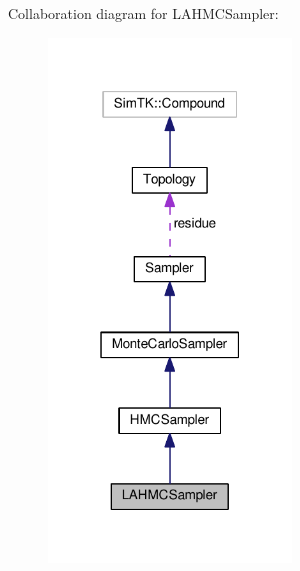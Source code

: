 Collaboration diagram for L\+A\+H\+M\+C\+Sampler\+:\nopagebreak
\begin{figure}[H]
\begin{center}
\leavevmode
\includegraphics[width=183pt]{classLAHMCSampler__coll__graph}
\end{center}
\end{figure}

